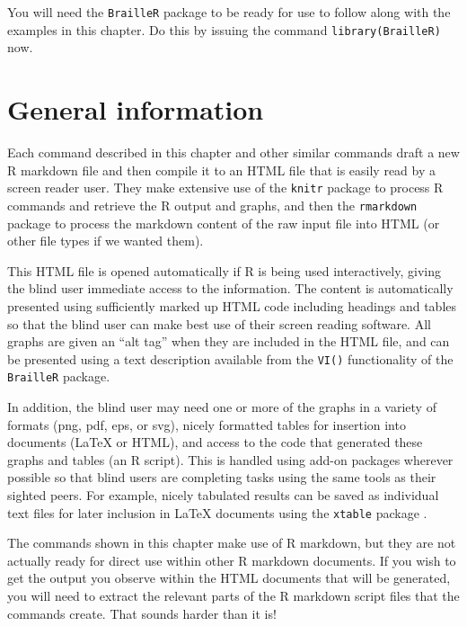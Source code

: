 \documentclass[
]{book}
\begin{document}
You will need the \texttt{BrailleR} package to be ready for use to follow along with the examples in this chapter. Do this by issuing the command \texttt{library(BrailleR)} now.

\hypertarget{general-information}{%
\section{General information}\label{general-information}}

Each command described in this chapter and other similar commands draft a new R markdown file and then compile it to an HTML file that is easily read by a screen reader user. They make extensive use of the \texttt{knitr} package \citep{Rpkg-knitr} to process R commands and retrieve the R output and graphs, and then the \texttt{rmarkdown} package \citep{Rpkg-rmarkdown} to process the markdown content of the raw input file into HTML (or other file types if we wanted them).

This HTML file is opened automatically if R is being used interactively, giving the blind user immediate access to the information. The content is automatically presented using sufficiently marked up HTML code including headings and tables so that the blind user can make best use of their screen reading software. All graphs are given an ``alt tag'' when they are included in the HTML file, and can be presented using a text description available from the \texttt{VI()} functionality of the \texttt{BrailleR} package.

In addition, the blind user may need one or more of the graphs in a variety of formats (png, pdf, eps, or svg), nicely formatted tables for insertion into documents (LaTeX or HTML), and access to the code that generated these graphs and tables (an R script).
This is handled using add-on packages wherever possible so that blind users are completing tasks using the same tools as their sighted peers. For example, nicely tabulated results can be saved as individual text files for later inclusion in LaTeX documents using the \texttt{xtable} package \citep{Rpkg-xtable}.

The commands shown in this chapter make use of R markdown, but they are not actually ready for direct use within other R markdown documents.
If you wish to get the output you observe within the HTML documents that will be generated, you will need to extract the relevant parts of the R markdown script files that the commands create. That sounds harder than it is!
\end{document}

